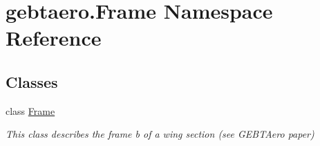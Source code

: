 \hypertarget{namespacegebtaero_1_1_frame}{}\section{gebtaero.\+Frame Namespace Reference}
\label{namespacegebtaero_1_1_frame}
\subsection*{Classes}
\begin{DoxyCompactItemize}
\item 
class \hyperlink{classgebtaero_1_1_frame_1_1_frame}{Frame}
\begin{DoxyCompactList}\small\item\em This class describes the frame b of a wing section (see G\+E\+B\+T\+Aero paper) \end{DoxyCompactList}\end{DoxyCompactItemize}
